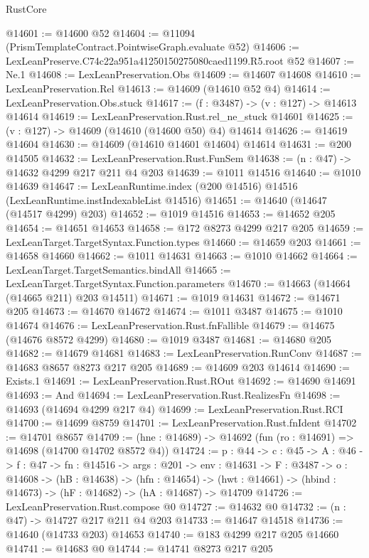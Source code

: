 \begin{lexlean}{RustCore}
\begin{coremodule}
@14601 := @14600 @52
@14604 := @11094 (PrismTemplateContract.PointwiseGraph.evaluate @52)
@14606 := LexLeanPreserve.C74c22a951a41250150275080caed1199.R5.root @52
@14607 := Ne.{1}
@14608 := LexLeanPreservation.Obs
@14609 := @14607 @14608
@14610 := LexLeanPreservation.Rel
@14613 := @14609 (@14610 @52 @4)
@14614 := LexLeanPreservation.Obs.stuck
@14617 := (f : @3487) -> (v : @127) -> @14613 @14614
@14619 := LexLeanPreservation.Rust.rel_ne_stuck @14601
@14625 := (v : @127) -> @14609 (@14610 (@14600 @50) @4) @14614
@14626 := @14619 @14604
@14630 := @14609 (@14610 @14601 @14604) @14614
@14631 := @200 @14505
@14632 := LexLeanPreservation.Rust.FunSem
@14638 := (n : @47) -> @14632 @4299 @217 @211 @4 @203
@14639 := @1011 @14516
@14640 := @1010 @14639
@14647 := LexLeanRuntime.index (@200 @14516) @14516 (LexLeanRuntime.instIndexableList @14516)
@14651 := @14640 (@14647 (@14517 @4299) @203)
@14652 := @1019 @14516
@14653 := @14652 @205
@14654 := @14651 @14653
@14658 := @172 @8273 @4299 @217 @205
@14659 := LexLeanTarget.TargetSyntax.Function.types
@14660 := @14659 @203
@14661 := @14658 @14660
@14662 := @1011 @14631
@14663 := @1010 @14662
@14664 := LexLeanTarget.TargetSemantics.bindAll
@14665 := LexLeanTarget.TargetSyntax.Function.parameters
@14670 := @14663 (@14664 (@14665 @211) @203 @14511)
@14671 := @1019 @14631
@14672 := @14671 @205
@14673 := @14670 @14672
@14674 := @1011 @3487
@14675 := @1010 @14674
@14676 := LexLeanPreservation.Rust.fnFallible
@14679 := @14675 (@14676 @8572 @4299)
@14680 := @1019 @3487
@14681 := @14680 @205
@14682 := @14679 @14681
@14683 := LexLeanPreservation.RunConv
@14687 := @14683 @8657 @8273 @217 @205
@14689 := @14609 @203 @14614
@14690 := Exists.{1}
@14691 := LexLeanPreservation.Rust.ROut
@14692 := @14690 @14691
@14693 := And
@14694 := LexLeanPreservation.Rust.RealizesFn
@14698 := @14693 (@14694 @4299 @217 @4)
@14699 := LexLeanPreservation.Rust.RCI
@14700 := @14699 @8759
@14701 := LexLeanPreservation.Rust.fnIdent
@14702 := @14701 @8657
@14709 := (hne : @14689) -> @14692 (fun (ro : @14691) => @14698 (@14700 @14702 @8572 @4))
@14724 := {p : @44} ->
  {c : @45} ->
  {A : @46} ->
  {f : @47} ->
  {fn : @14516} ->
  {args : @201} ->
  {env : @14631} ->
  {F : @3487} ->
  {o : @14608} ->
  (hB : @14638) ->
  (hfn : @14654) -> (hwt : @14661) -> (hbind : @14673) -> (hF : @14682) -> (hA : @14687) -> @14709
@14726 := LexLeanPreservation.Rust.compose @0
@14727 := @14632 @0
@14732 := (n : @47) -> @14727 @217 @211 @4 @203
@14733 := @14647 @14518
@14736 := @14640 (@14733 @203) @14653
@14740 := @183 @4299 @217 @205 @14660
@14741 := @14683 @0
@14744 := @14741 @8273 @217 @205

\end{coremodule}
\end{lexlean}
